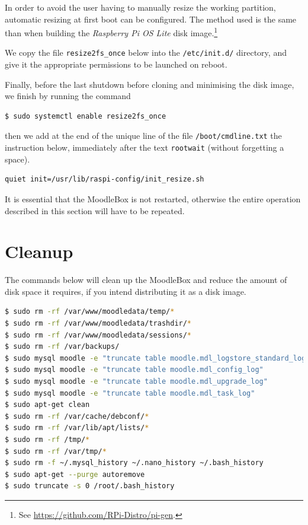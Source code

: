 \documentclass[12pt]{article}
\begin{document}
In order to avoid the user having to manually resize the working partition, automatic resizing at first boot can be configured.
The method used is the same than when building the \emph{Raspberry Pi OS Lite} disk image.\footnote{See \url{https://github.com/RPi-Distro/pi-gen}.}

We copy the file \lstinline{resize2fs_once} below into the \lstinline{/etc/init.d/} directory, and give it the appropriate permissions to be launched on reboot.


Finally, before the last shutdown before cloning and minimising the disk image, we finish by running the command
\begin{lstlisting}[language=bash]
$ sudo systemctl enable resize2fs_once
\end{lstlisting}
then we add at the end of the unique line of the file \lstinline{/boot/cmdline.txt} the instruction below, immediately after the text \lstinline{rootwait} (without forgetting a space).
\begin{lstlisting}[language=bash]
quiet init=/usr/lib/raspi-config/init_resize.sh
\end{lstlisting}

It is essential that the MoodleBox is not restarted, otherwise the entire operation described in this section will have to be repeated.

\section{Cleanup}

The commands below will clean up the MoodleBox and reduce the amount of disk space it requires, if you intend distributing it as a disk image.

\begin{lstlisting}[language=bash]
$ sudo rm -rf /var/www/moodledata/temp/*
$ sudo rm -rf /var/www/moodledata/trashdir/*
$ sudo rm -rf /var/www/moodledata/sessions/*
$ sudo rm -rf /var/backups/
$ sudo mysql moodle -e "truncate table moodle.mdl_logstore_standard_log"
$ sudo mysql moodle -e "truncate table moodle.mdl_config_log"
$ sudo mysql moodle -e "truncate table moodle.mdl_upgrade_log"
$ sudo mysql moodle -e "truncate table moodle.mdl_task_log"
$ sudo apt-get clean
$ sudo rm -rf /var/cache/debconf/*
$ sudo rm -rf /var/lib/apt/lists/*
$ sudo rm -rf /tmp/*
$ sudo rm -rf /var/tmp/*
$ sudo rm -f ~/.mysql_history ~/.nano_history ~/.bash_history
$ sudo apt-get --purge autoremove
$ sudo truncate -s 0 /root/.bash_history
\end{lstlisting}
\end{document}
